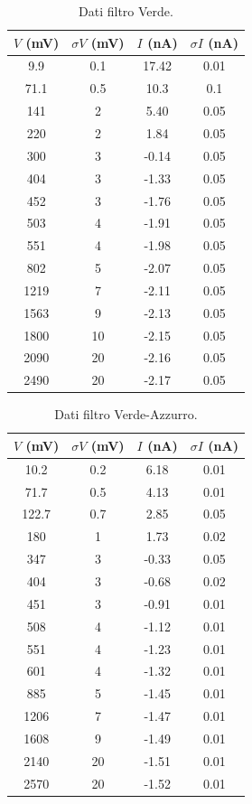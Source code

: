 \documentclass[10pt,a4paper]{article}
\begin{document}
\begin{table}[!htb]\centering
\begin{tabular}{|c|c|c|c|}
\hline
$V$ (mV) & $\sigma V$ (mV) & $I$ (nA) & $\sigma I$ (nA)\\
\hline
9.9 & 0.1 & 17.42 & 0.01\\
71.1 & 0.5 & 10.3 & 0.1\\
141 & 2 & 5.40 & 0.05\\
220 & 2 & 1.84 & 0.05\\
300 & 3 & -0.14 & 0.05\\
404 & 3 & -1.33 & 0.05\\
452 & 3 & -1.76 & 0.05\\
503 & 4 & -1.91 & 0.05\\
551 & 4 & -1.98 & 0.05\\
802 & 5 & -2.07 & 0.05\\
1219 & 7 & -2.11 & 0.05\\
1563 & 9 & -2.13 & 0.05\\
1800 & 10 & -2.15 & 0.05\\
2090 & 20 & -2.16 & 0.05\\
2490 & 20 & -2.17 & 0.05\\
\hline
\end{tabular}
\caption{Dati filtro Verde.}
\end{table}

\begin{table}[!htb]\centering
\begin{tabular}{|c|c|c|c|}
\hline
$V$ (mV) & $\sigma V$ (mV) & $I$ (nA) & $\sigma I$ (nA)\\
\hline
10.2 & 0.2 & 6.18 & 0.01\\
71.7 & 0.5 & 4.13 & 0.01\\
122.7 & 0.7 & 2.85 & 0.05\\
180 & 1 & 1.73 & 0.02\\
347 & 3 & -0.33 & 0.05\\
404 & 3 & -0.68 & 0.02\\
451 & 3 & -0.91 & 0.01\\
508 & 4 & -1.12 & 0.01\\
551 & 4 & -1.23 & 0.01\\
601 & 4 & -1.32 & 0.01\\
885 & 5 & -1.45 & 0.01\\
1206 & 7 & -1.47 & 0.01\\
1608 & 9 & -1.49 & 0.01\\
2140 & 20 & -1.51 & 0.01\\
2570 & 20 & -1.52 & 0.01\\
\hline
\end{tabular}
\caption{Dati filtro Verde-Azzurro.}
\end{table}
\end{document}
